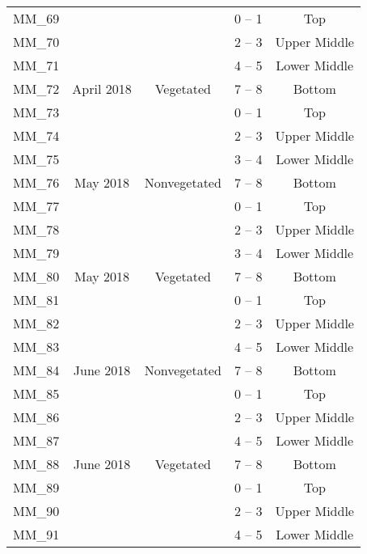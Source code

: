\documentclass[
  12 pt,
]{article}
\begin{document}
\begin{singlespace}
\begin{longtable}[t]{ccccc}
\cmidrule{1-5}\pagebreak[0]
MM\_69 &  &  & 0 – 1 & Top\\
\nopagebreak
MM\_70 &  &  & 2 – 3 & Upper Middle\\
\nopagebreak
MM\_71 &  &  & 4 – 5 & Lower Middle\\
\nopagebreak
MM\_72 & \multirow{-4}{*}{\centering\arraybackslash 23 April 2018} & \multirow{-4}{*}{\centering\arraybackslash Vegetated} & 7 – 8 & Bottom\\
\cmidrule{1-5}\pagebreak[0]
MM\_73 &  &  & 0 – 1 & Top\\
\nopagebreak
MM\_74 &  &  & 2 – 3 & Upper Middle\\
\nopagebreak
MM\_75 &  &  & 3 – 4 & Lower Middle\\
\nopagebreak
MM\_76 & \multirow{-4}{*}{\centering\arraybackslash 21 May 2018} & \multirow{-4}{*}{\centering\arraybackslash Nonvegetated} & 7 – 8 & Bottom\\
\cmidrule{1-5}\pagebreak[0]
MM\_77 &  &  & 0 – 1 & Top\\
\nopagebreak
MM\_78 &  &  & 2 – 3 & Upper Middle\\
\nopagebreak
MM\_79 &  &  & 3 – 4 & Lower Middle\\
\nopagebreak
MM\_80 & \multirow{-4}{*}{\centering\arraybackslash 21 May 2018} & \multirow{-4}{*}{\centering\arraybackslash Vegetated} & 7 – 8 & Bottom\\
\cmidrule{1-5}\pagebreak[0]
MM\_81 &  &  & 0 – 1 & Top\\
\nopagebreak
MM\_82 &  &  & 2 – 3 & Upper Middle\\
\nopagebreak
MM\_83 &  &  & 4 – 5 & Lower Middle\\
\nopagebreak
MM\_84 & \multirow{-4}{*}{\centering\arraybackslash 18 June 2018} & \multirow{-4}{*}{\centering\arraybackslash Nonvegetated} & 7 – 8 & Bottom\\
\cmidrule{1-5}\pagebreak[0]
MM\_85 &  &  & 0 – 1 & Top\\
\nopagebreak
MM\_86 &  &  & 2 – 3 & Upper Middle\\
\nopagebreak
MM\_87 &  &  & 4 – 5 & Lower Middle\\
\nopagebreak
MM\_88 & \multirow{-4}{*}{\centering\arraybackslash 18 June 2018} & \multirow{-4}{*}{\centering\arraybackslash Vegetated} & 7 – 8 & Bottom\\
\cmidrule{1-5}\pagebreak[0]
MM\_89 &  &  & 0 – 1 & Top\\
\nopagebreak
MM\_90 &  &  & 2 – 3 & Upper Middle\\
\nopagebreak
MM\_91 &  &  & 4 – 5 & Lower Middle\\

\end{longtable}
\end{singlespace}
\end{document}
